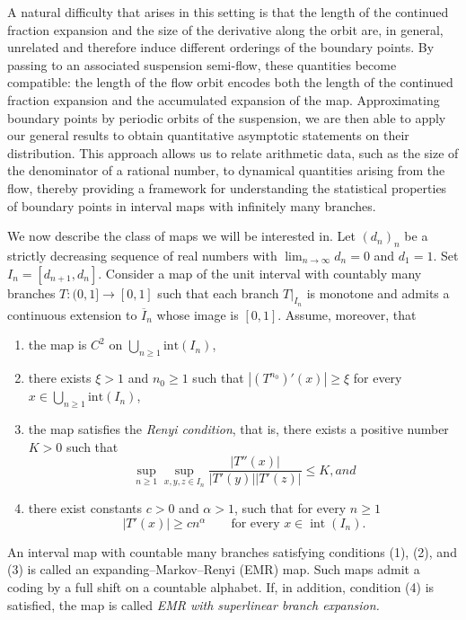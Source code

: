 \documentclass[letterpaper,11pt]{amsart}
\numberwithin{equation}{section}     %
\begin{document}
A natural difficulty that arises in this setting is that the length of the continued fraction expansion and the size of the derivative along the orbit are, in general, unrelated and therefore induce different orderings of the boundary points. By passing to an associated suspension semi-flow, these quantities become compatible: the length of the flow orbit encodes both the length of the continued fraction expansion and the accumulated expansion of the map. Approximating boundary points by periodic orbits of the suspension, we are then able to apply our general results to obtain quantitative asymptotic statements on their distribution. This approach allows us to relate arithmetic data, such as the size of the denominator of a rational number, to dynamical quantities arising from the flow, thereby providing a framework for understanding the statistical properties of boundary points in interval maps with infinitely many branches.

We now describe the class of maps we will be interested in. Let $(d_n)_n$ be a strictly decreasing sequence of real numbers with $\lim_{n\to\infty} d_n=0$ and $d_1=1$. Set $I_n=[d_{n+1},d_n]$. Consider a map of the unit interval with countably many branches  $T:(0,1] \to [0,1]$  such that each branch $T|_{I_n}$ is monotone and admits a continuous extension to $\overline I_n$ whose image is $[0,1]$. Assume, moreover, that
\begin{enumerate}
\item[(1)] the map is $C^2$ on $\bigcup_{n\geq 1} \textrm{int}(I_n)$,
\item[(2)] there exists $\xi>1$ and $n_0\geq 1$ such that $|(T^{n_0})'(x)|\geq\xi$ for every $x\in \bigcup_{n\geq 1} \textrm{int}(I_n)$, 
\item[(3)] the map satisfies the \emph{Renyi condition}, that is, there exists a positive number $K>0$ such that
\[
\sup_{n\geq 1}\sup_{x,y,z\in I_n} \frac{|T''(x)|}{|T'(y)||T'(z)|}\leq K, and
\]
\item[(4)] there exist constants $c>0$ and $\alpha>1$, such that for every $n\geq 1$
\[
 |T'(x)|\geq c n^\alpha
\qquad
\text{for every }x\in \operatorname{int}(I_n).
\]
\end{enumerate}

An interval map with countable many branches satisfying conditions (1), (2), and (3) is called an expanding–Markov–Renyi (EMR) map. Such maps admit a coding by a full shift on a countable alphabet. If, in addition, condition (4) is satisfied, the map is called \emph{EMR with superlinear branch expansion.} 
\end{document}
